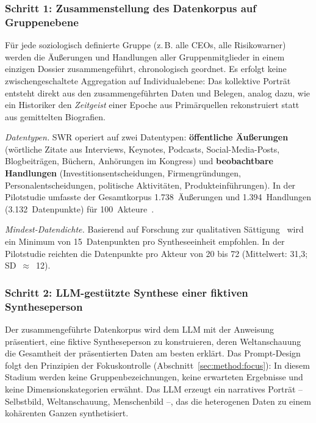 \documentclass[11pt,a4paper]{article}
\begin{document}
\subsubsection{Schritt 1: Zusammenstellung des Datenkorpus auf Gruppenebene}

Für jede soziologisch definierte Gruppe (z.\,B. \glqq{}alle CEOs\grqq{}, \glqq{}alle Risikowarner\grqq{}) werden die Äußerungen und Handlungen aller Gruppenmitglieder in einem einzigen Dossier zusammengeführt, chronologisch geordnet. Es erfolgt keine zwischengeschaltete Aggregation auf Individualebene: Das kollektive Porträt entsteht direkt aus den zusammengeführten Daten und Belegen, analog dazu, wie ein Historiker den \emph{Zeitgeist} einer Epoche aus Primärquellen rekonstruiert statt aus gemittelten Biografien.

\emph{Datentypen.} SWR operiert auf zwei Datentypen: \textbf{öffentliche Äußerungen} (wörtliche Zitate aus Interviews, Keynotes, Podcasts, Social-Media-Posts, Blogbeiträgen, Büchern, Anhörungen im Kongress) und \textbf{beobachtbare Handlungen} (Investitionsentscheidungen, Firmengründungen, Personalentscheidungen, politische Aktivitäten, Produkteinführungen). In der Pilotstudie umfasste der Gesamtkorpus 1.738~Äußerungen und 1.394~Handlungen (3.132~Datenpunkte) für 100~Akteure~\citep{Geiger2026PaperA}.

\emph{Mindest-Datendichte.} Basierend auf Forschung zur qualitativen Sättigung~\citep{Guest2006, FugardPotts2015} wird ein Minimum von 15~Datenpunkten pro Syntheseeinheit empfohlen. In der Pilotstudie reichten die Datenpunkte pro Akteur von 20 bis 72 (Mittelwert: 31,3; SD~$\approx$~12).

\subsubsection{Schritt 2: LLM-gestützte Synthese einer fiktiven Syntheseperson}

Der zusammengeführte Datenkorpus wird dem LLM mit der Anweisung präsentiert, eine fiktive Syntheseperson zu konstruieren, deren Weltanschauung die Gesamtheit der präsentierten Daten am besten erklärt. Das Prompt-Design folgt den Prinzipien der Fokuskontrolle (Abschnitt~\ref{sec:method:focus}): In diesem Stadium werden keine Gruppenbezeichnungen, keine erwarteten Ergebnisse und keine Dimensionskategorien erwähnt. Das LLM erzeugt ein narratives Porträt -- Selbstbild, Weltanschauung, Menschenbild --, das die heterogenen Daten zu einem kohärenten Ganzen synthetisiert.
\end{document}

